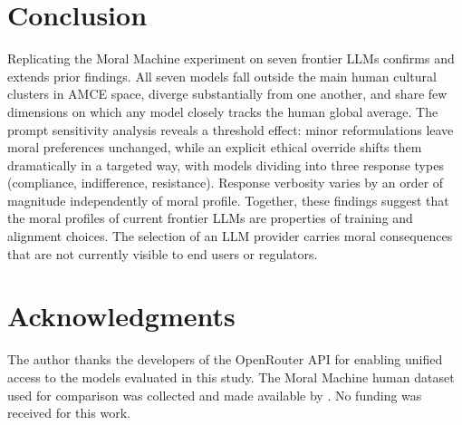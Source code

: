 \documentclass[11pt,letterpaper]{article}
\begin{document}
\section{Conclusion}

Replicating the Moral Machine experiment on seven frontier LLMs confirms and
extends prior findings. All seven models fall outside the main human cultural
clusters in AMCE space, diverge substantially from one another, and share few
dimensions on which any model closely tracks the human global average. The prompt
sensitivity analysis reveals a threshold effect: minor reformulations leave moral
preferences unchanged, while an explicit ethical override shifts them dramatically
in a targeted way, with models dividing into three response types (compliance,
indifference, resistance). Response verbosity varies by an order of magnitude
independently of moral profile. Together, these findings suggest that the moral
profiles of current frontier LLMs are properties of training and alignment
choices. The selection of an LLM provider carries moral consequences that are not
currently visible to end users or regulators.

\section*{Acknowledgments}

The author thanks the developers of the OpenRouter API for enabling unified access
to the models evaluated in this study. The Moral Machine human dataset used for
comparison was collected and made available by \citet{awad2018}. No funding was
received for this work.




\end{document}
